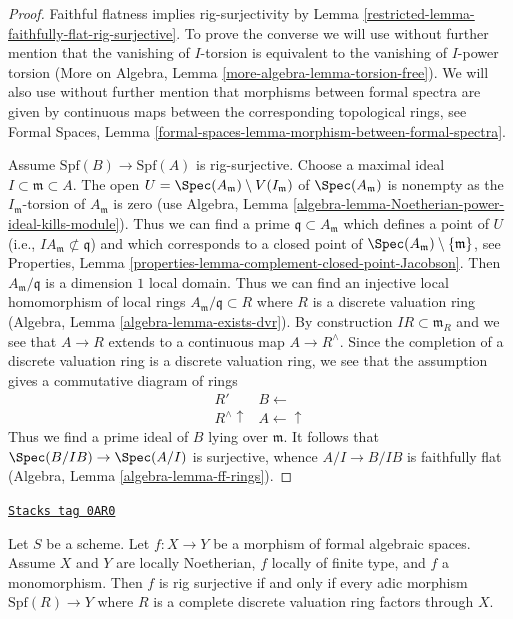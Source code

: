 \begin{proof}

Faithful flatness implies rig-surjectivity by
Lemma \ref{restricted-lemma-faithfully-flat-rig-surjective}.
To prove the converse we will use without further mention that the
vanishing of $I$-torsion is equivalent to the vanishing of $I$-power torsion
(More on Algebra, Lemma \ref{more-algebra-lemma-torsion-free}).
We will also use without further mention that morphisms between
formal spectra are given by continuous maps between the corresponding
topological rings, see
Formal Spaces, Lemma \ref{formal-spaces-lemma-morphism-between-formal-spectra}.

\medskip\noindent
Assume $\text{Spf}(B) \to \text{Spf}(A)$ is rig-surjective.
Choose a maximal ideal $I \subset \mathfrak m \subset A$.
The open $U = \Spec(A_\mathfrak m) \setminus V(I_\mathfrak m)$
of $\Spec(A_\mathfrak m)$ is nonempty as the $I_\mathfrak m$-torsion of
$A_\mathfrak m$ is zero
(use Algebra, Lemma \ref{algebra-lemma-Noetherian-power-ideal-kills-module}).
Thus we can find a prime $\mathfrak q \subset A_\mathfrak m$ which defines
a point of $U$ (i.e., $IA_\mathfrak m \not \subset \mathfrak q$)
and which corresponds to a closed point
of $\Spec(A_\mathfrak m) \setminus \{\mathfrak m\}$, see
Properties, Lemma \ref{properties-lemma-complement-closed-point-Jacobson}.
Then $A_\mathfrak m/\mathfrak q$ is a dimension $1$ local domain.
Thus we can find an injective local homomorphism of local rings
$A_\mathfrak m/\mathfrak q \subset R$ where $R$ is a discrete valuation ring
(Algebra, Lemma \ref{algebra-lemma-exists-dvr}).
By construction $IR \subset \mathfrak m_R$ and we see that
$A \to R$ extends to a continuous map $A \to R^\wedge$.
Since the completion of a discrete valuation ring is a discrete
valuation ring, we see that the assumption gives a commutative
diagram of rings
$$
\begin{array}{cc}R' & B \longleftarrow \\ R^\wedge \uparrow & A \longleftarrow\uparrow\end{array}
$$
Thus we find a prime ideal of $B$ lying over $\mathfrak m$. It follows
that $\Spec(B/IB) \to \Spec(A/I)$ is surjective, whence $A/I \to B/IB$
is faithfully flat
(Algebra, Lemma \ref{algebra-lemma-ff-rings}).
\end{proof}

\begin{lemma}
\label{restricted-lemma-monomorphism-rig-surjective}
\href{https://stacks.math.columbia.edu/tag/0AR0}{\texttt{Stacks tag 0AR0}}

Let $S$ be a scheme. Let $f : X \to Y$ be a morphism of formal algebraic
spaces. Assume $X$ and $Y$ are locally Noetherian, $f$ locally of finite
type, and $f$ a monomorphism. Then $f$ is rig surjective if and only if
every adic morphism $\text{Spf}(R) \to Y$ where $R$ is a complete discrete
valuation ring factors through $X$.
\end{lemma}

